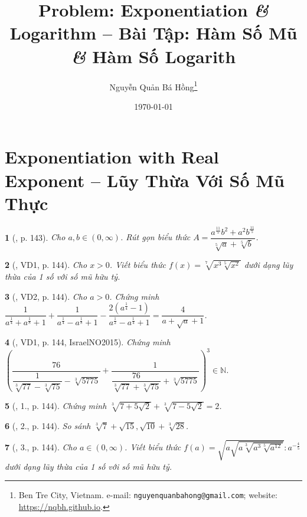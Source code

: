 \documentclass{article}
\title{Problem: Exponentiation {\it\&} Logarithm -- Bài Tập: Hàm Số Mũ {\it\&} Hàm Số Logarith}
\author{Nguyễn Quản Bá Hồng\footnote{Ben Tre City, Vietnam. e-mail: \texttt{nguyenquanbahong@gmail.com}; website: \url{https://nqbh.github.io}.}}
\date{\today}
\newtheorem{baitoan}{}
\begin{document}
\maketitle
\tableofcontents


\section{Exponentiation with Real Exponent -- Lũy Thừa Với Số Mũ Thực}

\begin{baitoan}[\cite{BTNC_Toan_11_DSGTXSTK}, p. 143]
	Cho $a,b\in(0,\infty)$. Rút gọn biểu thức $A = \dfrac{a^{\frac{11}{5}}b^2 + a^2b^{\frac{11}{5}}}{\sqrt[5]{a} + \sqrt[5]{b}}$.
\end{baitoan}

\begin{baitoan}[\cite{BTNC_Toan_11_DSGTXSTK}, VD1, p. 144]
	Cho $x > 0$. Viết biểu thức $f(x) = \sqrt[7]{x^3\sqrt[5]{x^2}}$ dưới dạng lũy thừa của 1 số với số mũ hữu tỷ.
\end{baitoan}

\begin{baitoan}[\cite{BTNC_Toan_11_DSGTXSTK}, VD2, p. 144]
	Cho $a > 0$. Chứng minh $\dfrac{1}{a^{\frac{1}{4}} + a^{\frac{1}{8}} + 1} + \dfrac{1}{a^{\frac{1}{4}} - a^{\frac{1}{8}} + 1} - \dfrac{2\left(a^{\frac{1}{4}} - 1\right)}{a^{\frac{1}{2}} - a^{\frac{1}{4}} + 1} = \dfrac{4}{a + \sqrt{a} + 1}$.
\end{baitoan}

\begin{baitoan}[\cite{BTNC_Toan_11_DSGTXSTK}, VD1, p. 144, IsraelNO2015]
	Chứng minh $\left(\dfrac{76}{\dfrac{1}{\sqrt[3]{77} - \sqrt[3]{75}} - \sqrt[3]{5775}} + \dfrac{1}{\dfrac{76}{\sqrt[3]{77} + \sqrt[3]{75}} + \sqrt[3]{5775}}\right)^3\in\mathbb{N}$.
\end{baitoan}

\begin{baitoan}[\cite{BTNC_Toan_11_DSGTXSTK}, 1., p. 144]
	Chứng minh $\sqrt[3]{7 + 5\sqrt{2}} + \sqrt[3]{7 - 5\sqrt{2}} = 2$.
\end{baitoan}

\begin{baitoan}[\cite{BTNC_Toan_11_DSGTXSTK}, 2., p. 144]
	So sánh $\sqrt[3]{7} + \sqrt{15},\sqrt{10} + \sqrt[3]{28}$.
\end{baitoan}

\begin{baitoan}[\cite{BTNC_Toan_11_DSGTXSTK}, 3., p. 144]
	Cho $a\in(0,\infty)$. Viết biểu thức $f(a) = \sqrt{a\sqrt{a\sqrt[3]{a^3\sqrt[5]{a^{12}}}}}:a^{-\frac{4}{5}}$ dưới dạng lũy thừa của 1 số với số mũ hữu tỷ.
\end{baitoan}
\end{document}
